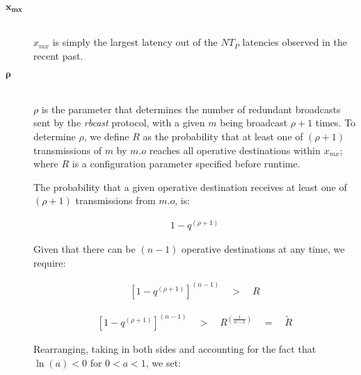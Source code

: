         \begin{description}
        \item[\Huge$\boldsymbol{x_{mx}}$] \hfill \\
        $x_{mx}$ is simply the largest latency out of the $NT_P$ latencies observed in the recent past.  
        
        \item[\Huge$\boldsymbol{\rho}$] \hfill \\
        $\rho$ is the parameter that determines the number of redundant broadcasts sent by the \emph{rbcast} protocol, with a given $m$ being broadcast $\rho + 1$ times.  To determine $\rho$, we define $R$ as the probability that at least one of $(\rho + 1)$ transmissions of $m$ by $m.o$ reaches all operative destinations within $x_{mx}$; where $R$ is a configuration parameter specified before runtime.  
        
        The probability that a given operative destination receives at least one of $(\rho + 1)$ transmissions from $m.o$, is:
        
        \begin{equation}
            \begin{aligned}
                1 - q^{\left( \rho + 1 \right)}
            \end{aligned}
        \end{equation}
        
        Given that there can be $(n - 1)$ operative destinations at any time, we require:
        
        \begin{equation}
            \begin{aligned}
                \left[1 - q^{\left(\rho + 1\right)}\right]^{\left(n - 1\right)} \quad > \quad R
            \end{aligned}
        \end{equation}
        
        \begin{equation} \label{eq:q_mx}
            \begin{aligned}
                \left[1 - q^{\left(\rho + 1\right)}\right]^{\left(n - 1\right)} \quad > \quad R ^{\left(\frac{1}{n - 1}\right)} \quad = \quad \tilde{R}
            \end{aligned}
        \end{equation}
        
        Rearranging, taking in both sides and accounting for the fact that $\ln(a) < 0$ for  $0 < a < 1$, we set:
        

\end{description}
